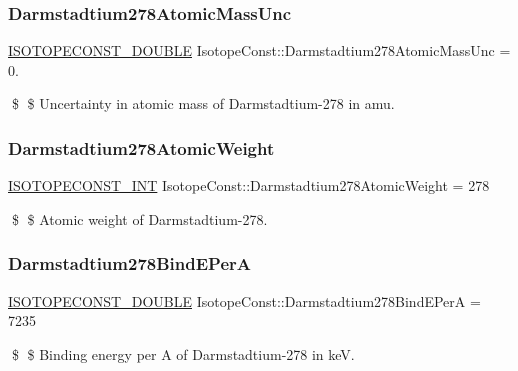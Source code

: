 \subsubsection{\texorpdfstring{Darmstadtium278\+Atomic\+Mass\+Unc}{Darmstadtium278AtomicMassUnc}}
{\footnotesize\ttfamily \mbox{\hyperlink{group___isotope_const-_macros_ga8f45a7272ce02c0b4c65c44636ed719a}{I\+S\+O\+T\+O\+P\+E\+C\+O\+N\+S\+T\+\_\+\+D\+O\+U\+B\+LE}} Isotope\+Const\+::\+Darmstadtium278\+Atomic\+Mass\+Unc = 0.}

\$ \$ Uncertainty in atomic mass of Darmstadtium-\/278 in amu. \mbox{\label{group___isotope_const-_darmstadtium-_ds278_gab03accbd1aa7f2f7b2e4813ffbfc95df}} 
\subsubsection{\texorpdfstring{Darmstadtium278\+Atomic\+Weight}{Darmstadtium278AtomicWeight}}
{\footnotesize\ttfamily \mbox{\hyperlink{group___isotope_const-_macros_ga5f18360b3e99483a35c32d789e62621c}{I\+S\+O\+T\+O\+P\+E\+C\+O\+N\+S\+T\+\_\+\+I\+NT}} Isotope\+Const\+::\+Darmstadtium278\+Atomic\+Weight = 278}

\$ \$ Atomic weight of Darmstadtium-\/278. \mbox{\label{group___isotope_const-_darmstadtium-_ds278_ga0ba86c5e199256cad314a49721afe355}} 
\subsubsection{\texorpdfstring{Darmstadtium278\+Bind\+E\+PerA}{Darmstadtium278BindEPerA}}
{\footnotesize\ttfamily \mbox{\hyperlink{group___isotope_const-_macros_ga8f45a7272ce02c0b4c65c44636ed719a}{I\+S\+O\+T\+O\+P\+E\+C\+O\+N\+S\+T\+\_\+\+D\+O\+U\+B\+LE}} Isotope\+Const\+::\+Darmstadtium278\+Bind\+E\+PerA = 7235}

\$ \$ Binding energy per A of Darmstadtium-\/278 in keV. \mbox{\label{group___isotope_const-_darmstadtium-_ds278_ga21a83523d3380e33e6805161f7bcd491}} 

